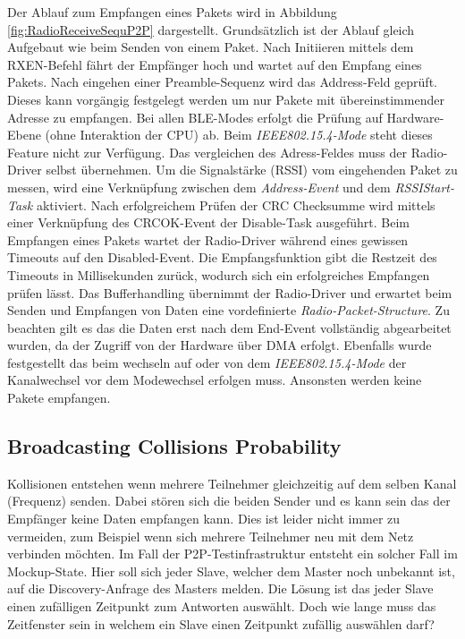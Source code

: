 
Der Ablauf zum Empfangen eines Pakets wird in Abbildung \ref{fig:RadioReceiveSequP2P} dargestellt. Grundsätzlich ist der Ablauf gleich Aufgebaut wie beim Senden von einem Paket. Nach Initiieren mittels dem RXEN-Befehl fährt der Empfänger hoch und wartet auf den Empfang eines Pakets. Nach eingehen einer Preamble-Sequenz wird das Address-Feld geprüft. Dieses kann vorgängig festgelegt werden um nur Pakete mit übereinstimmender Adresse zu empfangen. Bei allen BLE-Modes erfolgt die Prüfung auf Hardware-Ebene (ohne Interaktion der CPU) ab. Beim \textit{IEEE802.15.4-Mode} steht dieses Feature nicht zur Verfügung. Das vergleichen des Adress-Feldes muss der Radio-Driver selbst übernehmen. Um die Signalstärke (RSSI) vom eingehenden Paket zu messen, wird eine Verknüpfung zwischen dem \textit{Address-Event} und dem \textit{RSSIStart-Task} aktiviert. Nach erfolgreichem Prüfen der CRC Checksumme wird mittels einer Verknüpfung des CRCOK-Event der Disable-Task ausgeführt. Beim Empfangen eines Pakets wartet der Radio-Driver während eines gewissen Timeouts auf den Disabled-Event. Die Empfangsfunktion gibt die Restzeit des Timeouts in Millisekunden zurück, wodurch sich ein erfolgreiches Empfangen prüfen lässt. Das Bufferhandling übernimmt der Radio-Driver und erwartet beim Senden und Empfangen von Daten eine vordefinierte \textit{Radio-Packet-Structure}. Zu beachten gilt es das die Daten erst nach dem End-Event  vollständig abgearbeitet wurden, da der Zugriff von der Hardware über DMA erfolgt. Ebenfalls wurde festgestellt das beim wechseln auf oder von dem \textit{IEEE802.15.4-Mode} der Kanalwechsel vor dem Modewechsel erfolgen muss. Ansonsten werden keine Pakete empfangen. \cite{nordic_semi_nrf_infocenter_radio_receive_sequence_2020}


\subsection{Broadcasting Collisions Probability}\label{sec:BroadcastingCollissionsProbability}

Kollisionen entstehen wenn mehrere Teilnehmer gleichzeitig auf dem selben Kanal (Frequenz) senden. Dabei stören sich die beiden Sender und es kann sein das der Empfänger keine Daten empfangen kann. Dies ist leider nicht immer zu vermeiden, zum Beispiel wenn sich mehrere Teilnehmer neu mit dem Netz verbinden möchten. Im Fall der P2P-Testinfrastruktur entsteht ein solcher Fall im Mockup-State. Hier soll sich jeder Slave, welcher dem Master noch unbekannt ist, auf die Discovery-Anfrage des Masters melden. Die Lösung ist das jeder Slave einen zufälligen Zeitpunkt zum Antworten auswählt. Doch wie lange muss das Zeitfenster sein in welchem ein Slave einen Zeitpunkt zufällig auswählen darf? \\

